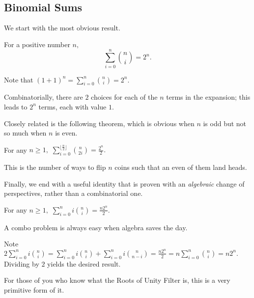 \subsection{Binomial Sums}

We start with the most obvious result.

\begin{theo}
For a positive number $n,$
\[\sum_{i=0}^{n}\binom{n}{i}=2^n.\]
\end{theo}

\begin{pro}
Note that $(1+1)^n=\sum\limits_{i=0}^{n}\binom{n}{i}=2^n.$

Combinatorially, there are $2$ choices for each of the $n$ terms in the expansion; this leads to $2^n$ terms, each with value $1.$
\end{pro}

Closely related is the following theorem, which is obvious when $n$ is odd but not so much when $n$ is even.

\begin{exam}
For any $n\geq 1,$ $\sum\limits_{i=0}^{\lfloor\frac{n}{2}\rfloor}\binom{n}{2i}=\frac{2^n}{2}.$
\end{exam}

\begin{sol}
This is the number of ways to flip $n$ coins such that an even of them land heads.
\end{sol}

Finally, we end with a useful identity that is proven with an \textit{algebraic} change of perspectives, rather than a combinatorial one.

\begin{exam}
For any $n\geq 1,$ $\sum\limits_{i=0}^{n}i\binom{n}{i}=\frac{n2^n}{2}.$
\end{exam}

\begin{sol}
A combo problem is always easy when algebra saves the day.

Note $2\sum\limits_{i=0}^{n}i\binom{n}{i}=\sum\limits_{i=0}^{n}i\binom{n}{i}+\sum\limits_{i=0}^{n}i\binom{n}{n-i}=\frac{n2^n}{2}=n\sum\limits_{i=0}^{n}\binom{n}{i}=n2^n.$ Dividing by $2$ yields the desired result.
\end{sol}

For those of you who know what the Roots of Unity Filter is, this is a very primitive form of it.